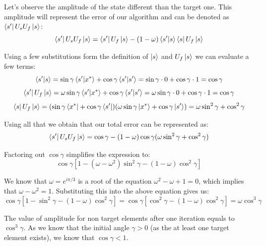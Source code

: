 Let's observe the amplitude of the state different than the target one. 
This amplitude will represent the error of our algorithm and can be denoted as $\bra{s'} U_s U_f \ket{s}$:
\bigskip
\begin{equation}
    \bra{s'} U_s U_f \ket{s} = \bra{s'} U_f \ket{s} - (1 - \omega)\bra{s'} \ket{s} \bra{s} U_f \ket{s}
\end{equation}
%
%
\bigskip

Using a few substitutions form the definition of $\ket{s}$ and $U_f \ket{s}$ we can evaluate a few terms: 
\bigskip
\begin{equation}
    \bra{s'} \ket{s} = \sin \gamma \bra{s'}\ket{x^*} + \cos \gamma \bra{s'} \ket{s'} = \sin \gamma \cdot 0 +  \cos \gamma \cdot 1 = \cos \gamma
\end{equation}
\bigskip
\begin{equation}
    \bra{s'} U_f \ket{s} = \omega \sin \gamma \bra{s'} \ket{x^*} + \cos \gamma \bra{s'} \ket{s'} = \omega \sin \gamma \cdot 0 +  \cos \gamma \cdot 1 = \cos \gamma
\end{equation}
\bigskip
\begin{equation}
    \bra{s} U_f \ket{s} = (\sin\gamma\bra{x^*} + \cos\gamma\bra{s'})(\omega\sin\gamma\ket{x^*} + \cos\gamma\ket{s'}) = \omega\sin^2\gamma + \cos^2\gamma
\end{equation}
\bigskip

Using all that we obtain that our total error can be represented as:
\bigskip
\begin{equation}
    \bra{s'} U_s U_f \ket{s} = \cos\gamma - (1 - \omega)\cos\gamma (\omega\sin^2\gamma + \cos^2\gamma)
\end{equation}
%
%
\bigskip

Factoring out $\cos\gamma$ simplifies the expression to:
\bigskip
\begin{equation}
    \cos\gamma [ 1 - (\omega - \omega^2)\sin^2\gamma - (1 - \omega)\cos^2\gamma ]
\end{equation}
%
%
\bigskip

We know that $\omega = e^{i\pi/3}$ is a root of the equation $\omega^2 - \omega + 1 = 0$, 
which implies that $\omega - \omega^2 = 1$. Substituting this into the above equation gives us:
\begin{equation}
    \cos\gamma [ 1 - \sin^2\gamma - (1 - \omega)\cos^2\gamma ] = \cos\gamma [ \cos^2\gamma - (1 - \omega)\cos^2\gamma ] = \omega \cos^3\gamma
\end{equation}
\bigskip
%
%

The value of amplitude for non target elements after one iteration equals to $\cos^3\gamma$. 
As we know that the initial angle $\gamma > 0$ (as the at least one target element exists), we know that $\cos\gamma < 1$.
%
%


